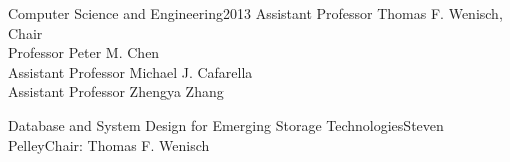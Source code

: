 \documentclass[reqno,12pt,oneside]{report} %
\theoremstyle{plain}
\theoremstyle{definition}
\theoremstyle{remark}
\numberwithin{theorem}{chapter}     %
\begin{document}

{Computer Science and Engineering}{2013}
{Assistant Professor Thomas F. Wenisch, Chair\\
 Professor Peter M. Chen\\
 Assistant Professor Michael J. Cafarella\\
 Assistant Professor Zhengya Zhang}

\initializefrontsections



\makeatletter
\if@twoside \setcounter{page}{4} \else \setcounter{page}{0} \fi
\makeatother
 

%

%

\tableofcontents     %
\listoffigures       %
\listoftables        %
\listofappendices    %

\startabstractpage
{Database and System Design for Emerging Storage Technologies}{Steven Pelley}{Chair: Thomas F. Wenisch}

\label{Abstract}

\startthechapters 
\end{document}
